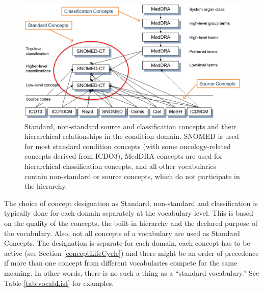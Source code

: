 \documentclass[11pt]{book}
\theoremstyle{definition}
\theoremstyle{definition}
\theoremstyle{definition}
\theoremstyle{remark}
\begin{document}
\begin{figure}

{\centering \includegraphics[width=1\linewidth]{images/StandardizedVocabularies/hierarchy} 

}

\caption{Standard, non-standard source and classification concepts and their hierarchical relationships in the condition domain. SNOMED is used for most standard condition concepts (with some oncology-related concepts derived from ICDO3), MedDRA concepts are used for hierarchical classification concepts, and all other vocabularies contain non-standard or source concepts, which do not participate in the hierarchy.}\label{fig:hierarchy}
\end{figure}

The choice of concept designation as Standard, non-standard and
classification is typically done for each domain separately at the
vocabulary level. This is based on the quality of the concepts, the
built-in hierarchy and the declared purpose of the vocabulary. Also, not
all concepts of a vocabulary are used as Standard Concepts. The
designation is separate for each domain, each concept has to be active
(see Section \ref{conceptLifeCycle}) and there might be an order of
precedence if more than one concept from different vocabularies compete
for the same meaning. In other words, there is no such a thing as a
``standard vocabulary.'' See Table \ref{tab:vocabList} for examples.
\end{document}
